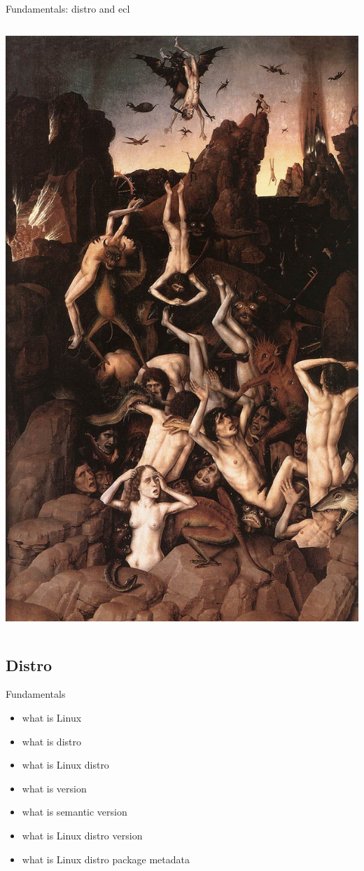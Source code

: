 \documentclass{beamer}
\begin{document}
\begin{frame}{Fundamentals: distro and ecl}
\begin{columns}
            \includegraphics[width=\linewidth,trim={0 1cm 0 1.7cm},clip]{img/Dirk_Bouts_-_Hell.jpg}
    \end{columns}
\end{frame}

\subsection{Distro}

\begin{frame}{Fundamentals}
    \begin{itemize}
        \item what is Linux
        \item what is distro
        \item what is Linux distro
        \item what is version
        \item what is semantic version
        \item what is Linux distro version
        \item what is Linux distro package metadata
    \end{itemize}
\end{frame}
\end{document}
